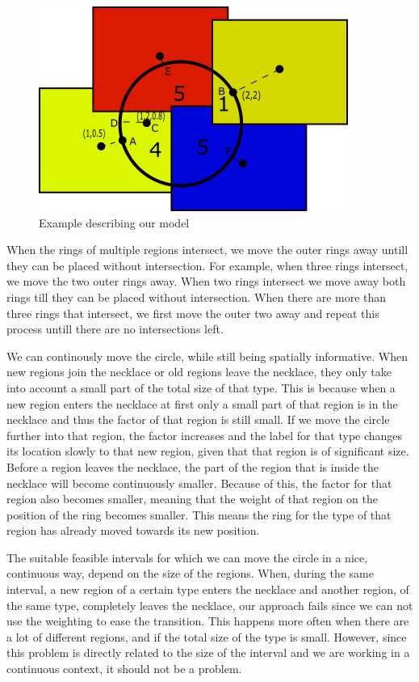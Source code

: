 \documentclass[a4paper,11pt]{article}
\begin{document}
\begin{figure}[H]
	\centering
	\includegraphics{figure1.png}
	\caption{Example describing our model}
	\label{fig:example}
\end{figure}

When the rings of multiple regions intersect, we move the outer rings away untill they can be placed without intersection.
For example, when three rings intersect, we move the two outer rings away.
When two rings intersect we move away both rings till they can be placed without intersection. 
When there are more than three rings that intersect, we first move the outer two away and repeat this process untill there are no intersections left.

We can continously move the circle, while still being spatially informative. 
When new regions join the necklace or old regions leave the necklace, they only take into account a small part of the total size of that type. 
This is because when a new region enters the necklace at first only a small part of that region is in the necklace and thus the factor of that region is still small. 
If we move the circle further into that region, the factor increases and the label for that type changes its location slowly to that new region, given that that region is of significant size.
Before a region leaves the necklace, the part of the region that is inside the necklace will become continuously smaller.
Because of this, the factor for that region also becomes smaller, meaning that the weight of that region on the position of the ring becomes smaller.
This means the ring for the type of that region has already moved towards its new position.

The suitable feasible intervals for which we can move the circle in a nice, continuous way, depend on the size of the regions.
When, during the same interval, a new region of a certain type enters the necklace and another region, of the same type, completely leaves the necklace, our approach fails since we can not use the weighting to ease the transition.
This happens more often when there are a lot of different regions, and if the total size of the type is small.
However, since this problem is directly related to the size of the interval and we are working in a continuous context, it should not be a problem.
\end{document}
